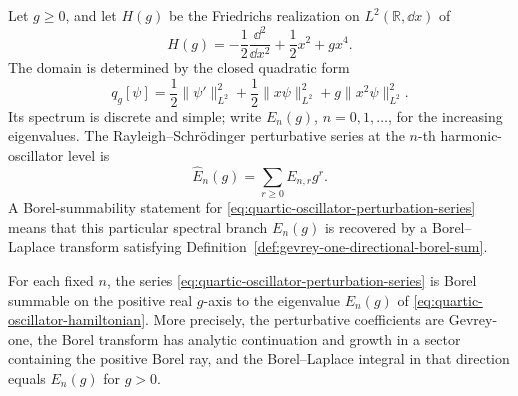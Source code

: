 \begin{definition}
\label{def:quartic-oscillator-spectral-borel-problem}
Let \(g\ge0\), and let \(H(g)\) be the Friedrichs realization on
\(L^2(\mathbb R,\dd x)\) of
\begin{equation}
  H(g)
  =
  -\frac12\frac{\dd^2}{\dd x^2}
  +\frac12x^2
  +g x^4 .
  \label{eq:quartic-oscillator-hamiltonian}
\end{equation}
The domain is determined by the closed quadratic form
\[
  q_g[\psi]
  =
  \frac12\|\psi'\|_{L^2}^2
  +\frac12\|x\psi\|_{L^2}^2
  +g\|x^2\psi\|_{L^2}^2 .
\]
Its spectrum is discrete and simple; write \(E_n(g)\), \(n=0,1,\ldots\), for
the increasing eigenvalues.  The Rayleigh--Schr\"odinger perturbative series at
the \(n\)-th harmonic-oscillator level is
\begin{equation}
  \widehat E_n(g)=\sum_{r\ge0}E_{n,r}g^r .
  \label{eq:quartic-oscillator-perturbation-series}
\end{equation}
A Borel-summability statement for
\eqref{eq:quartic-oscillator-perturbation-series} means that this particular
spectral branch \(E_n(g)\) is recovered by a Borel--Laplace transform
satisfying
Definition~\ref{def:gevrey-one-directional-borel-sum}.
\end{definition}

\begin{quotedtheorem}
\label{qthm:quartic-oscillator-borel-summability}
For each fixed \(n\), the series
\eqref{eq:quartic-oscillator-perturbation-series} is Borel summable on the
positive real \(g\)-axis to the eigenvalue \(E_n(g)\) of
\eqref{eq:quartic-oscillator-hamiltonian}.  More precisely, the perturbative
coefficients are Gevrey-one, the Borel transform has analytic continuation
and growth in a sector containing the positive Borel ray, and the
Borel--Laplace integral in that direction equals \(E_n(g)\) for \(g>0\).
\end{quotedtheorem}

